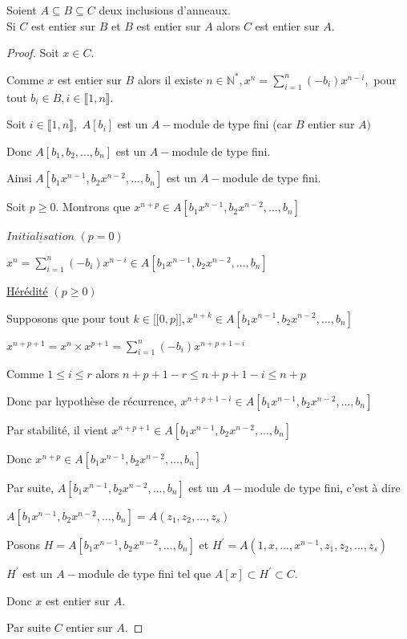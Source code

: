 \begin{moncorollaire}
	Soient $A \subseteq B \subseteq C $ deux inclusions d'anneaux.\\
	Si $C$ est entier sur $B$ et $B$ est entier sur $A$ alors $C$ est entier sur $A$.
\end{moncorollaire}
\begin{proof}
	Soit $x\in C.$
	
	Comme $x$ est entier sur $B$ alors il existe $n\in \mathbb{N}^{\ast },x^{n}=\sum\limits_{i=1}^{n}(-b_{i})x^{n-i},$ pour tout $b_{i}\in
	B,i\in \llbracket 1, n \rrbracket.$
	
	Soit $i\in \llbracket 1, n \rrbracket,$ $A[b_{i}]$ est un $A-$module de type fini
	(car $B$ entier sur $A)$
	
	Donc $A[b_{1},b_{2},...,b_{n}]$ est un $A-$module de type fini.
	
	Ainsi $A[b_{1}x^{n-1},b_{2}x^{n-2},...,b_{n}]$ est un $A-$module de type
	fini.
	
	Soit $p\geq 0.$ Montrons que $x^{n+p}\in
	A[b_{1}x^{n-1},b_{2}x^{n-2},...,b_{n}]$
	
	$\underline{Initialisation}$ $(p=0)$
	
	$x^{n}=\sum\limits_{i=1}^{n}(-b_{i})x^{n-i}\in
	A[b_{1}x^{n-1},b_{2}x^{n-2},...,b_{n}]$
	
	\underline{Hérédité} $(p\geq 0)$
	
	Supposons que pour tout $k\in \lbrack \lbrack 0,p]],x^{n+k}\in
	A[b_{1}x^{n-1},b_{2}x^{n-2},...,b_{n}]$
	
	$x^{n+p+1}=x^{n}\times x^{p+1}=\sum\limits_{i=1}^{n}(-b_{i})x^{n+p+1-i}$
	
	Comme $1\leq i\leq r$ alors $n+p+1-r\leq n+p+1-i\leq n+p$
	
	Donc par hypothèse de récurrence, $x^{n+p+1-i}\in
	A[b_{1}x^{n-1},b_{2}x^{n-2},...,b_{n}]$
	
	Par stabilité, il vient $x^{n+p+1}\in
	A[b_{1}x^{n-1},b_{2}x^{n-2},...,b_{n}]$
	
	Donc $x^{n+p}\in A[b_{1}x^{n-1},b_{2}x^{n-2},...,b_{n}]$
	
	Par suite, $A[b_{1}x^{n-1},b_{2}x^{n-2},...,b_{n}]$ est un $A-$module de
	type fini, c'est à dire 
	
	$A[b_{1}x^{n-1},b_{2}x^{n-2},...,b_{n}]=A(z_{1},z_{2},...,z_{s})$
	
	Posons $H=A[b_{1}x^{n-1},b_{2}x^{n-2},...,b_{n}]$ et $H^{\prime
	}=A(1,x,...,x^{n-1},z_{1},z_{2},...,z_{s})$
	
	$H^{\prime }$ est un $A-$module de type fini tel que $A[x]\subset H^{\prime
	}\subset C.$
	
	Donc $x$ est entier sur $A.$
	
	Par suite $C$ entier sur $A.$
\end{proof}
